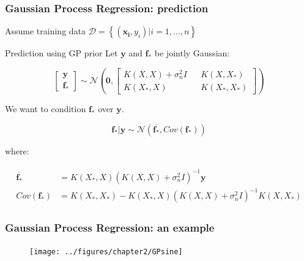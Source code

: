 \documentclass[10pt,usenames,dvipsnames]{beamer}
\begin{document}
		\begin{frame}
			\frametitle{Gaussian Process Regression: prediction}
			Assume training data  $\mathcal{D} = \left\lbrace \left(\boldsymbol{x_i}, y_i\right) | i = 1,\dots,n\right\rbrace$
			\begin{block}{Prediction using GP prior}
				Let $\boldsymbol{y}$ and $\boldsymbol{f_*}$ be jointly Gaussian:
				
				\begin{equation}
				\begin{bmatrix}
				\boldsymbol{y}\\
				\boldsymbol{f_*}
				\end{bmatrix} \sim \mathcal{N}\left(
				\boldsymbol{0},
				\begin{bmatrix}
				K(X, X) + \sigma^2_n I && K(X, X_*) \\
				K(X_*, X) && K(X_*, X_*)
				\end{bmatrix}
				\right)
				\end{equation}
				
				We want to condition $\boldsymbol{f_*}$ over $\boldsymbol{y}$.
				
				\begin{equation}
				\boldsymbol{f_*|y} \sim \mathcal{N}(\boldsymbol{\overline{f_*}},  Cov(\boldsymbol{f_*}))
				\end{equation}
				
				where:
				
				\begin{align}
				\begin{split}
				\boldsymbol{\overline{f_*}} &= K(X_*, X)\left(K(X, X) + \sigma^2_n I   \right)^{-1}\boldsymbol{y}\\
				Cov(\boldsymbol{f_*}) &= K(X_*, X_*) - K(X_*, X)\left(K(X, X) + \sigma_n^2 I \right)^{-1}K(X, X_*)
				\end{split}
				\end{align}
				
			
			\end{block}
		\end{frame}
		
		\begin{frame}
			\frametitle{Gaussian Process Regression: an example}
			\begin{figure}
				\texttt{[image: ../figures/chapter2/GPsine]}
			\end{figure}
		\end{frame}
		
\end{document}
